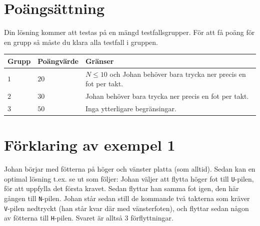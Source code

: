 \section*{Poängsättning}
Din lösning kommer att testas på en mängd testfallsgrupper.
För att få poäng för en grupp så måste du klara alla testfall i gruppen.

\noindent
\begin{tabular}{| l | l | p{12cm} |}
  \hline
  Grupp & Poängvärde & Gränser \\ \hline
  $1$    & $20$        & $N \le 10$ och Johan behöver bara trycka ner precis en fot per takt. \\ \hline 
  $2$    & $30$        & Johan behöver bara trycka ner precis en fot per takt. \\ \hline
  $3$    & $50$        & Inga ytterligare begränsingar. \\ \hline 
\end{tabular}

\section*{Förklaring av exempel 1}
Johan börjar med fötterna på höger och vänster platta (som alltid).
Sedan kan en optimal lösning t.ex. se ut som följer: Johan väljer att flytta höger fot till \texttt{U}-pilen, för att uppfylla det första kravet.
Sedan flyttar han samma fot igen, den här gången till \texttt{N}-pilen.
Johan står sedan still de kommande två takterna som kräver \texttt{V}-pilen nedtryckt (han står kvar där med vänsterfoten), och flyttar sedan någon av fötterna till \texttt{H}-pilen.
Svaret är alltså $3$ förflyttningar.

